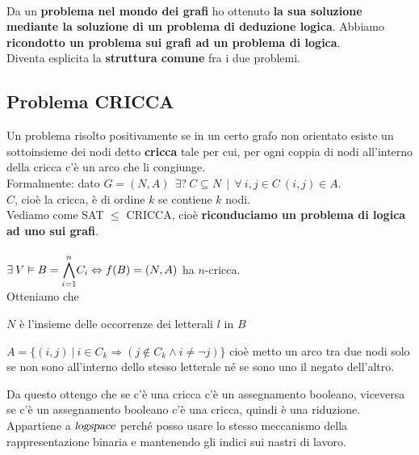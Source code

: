\documentclass[10pt]{book}
\begin{document}
\paragraph{} Da un \textbf{problema nel mondo dei grafi} ho ottenuto \textbf{la sua soluzione mediante la soluzione di un problema di deduzione logica}. Abbiamo \textbf{ricondotto un problema sui grafi ad un problema di logica}.\\
Diventa esplicita la \textbf{struttura comune} fra i due problemi.
\subsection{Problema CRICCA}
Un problema risolto positivamente se in un certo grafo non orientato esiste un sottoinsieme dei nodi detto \textbf{cricca} tale per cui, per ogni coppia di nodi all'interno della cricca c'è un arco che li congiunge.\\
Formalmente: dato $G = (N, A)\:\:\exists?\:C\subseteq N\:\:|\:\:\forall\:i,j\in C\:(i,j)\in A$.\\
$C$, cioè la cricca, è di ordine $k$ se contiene $k$ nodi.\\
Vediamo come SAT $\leq$ CRICCA, cioè \textbf{riconduciamo un problema di logica ad uno sui grafi}.\\\\
$\exists\:V\vDash B = \mathlarger{\bigwedge_{i=1}^n} C_i \Leftrightarrow f(B) = (N, A)$ ha $n$-cricca.\\Otteniamo che
\begin{list}{}{}
	\item $N$ è l'insieme delle occorrenze dei letterali $l$ in $B$
	\item $A = \{(i, j)\:|\: i\in C_k \Rightarrow (j\not\in C_k \wedge i \neq \neg j)\}$ cioè metto un arco tra due nodi solo se non sono all'interno dello stesso letterale né se sono uno il negato dell'altro.
\end{list}
Da questo ottengo che se c'è una cricca c'è un assegnamento booleano, viceversa se c'è un assegnamento booleano c'è una cricca, quindi è una riduzione.\\
Appartiene a $\textsl{logspace}$ perché posso usare lo stesso meccanismo della rappresentazione binaria e mantenendo gli indici sui nastri di lavoro.
\end{document}
